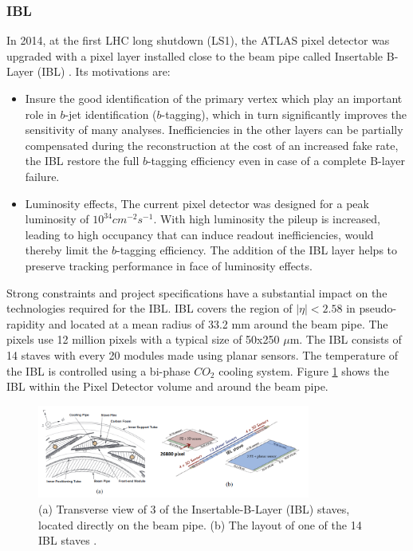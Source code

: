 \subsubsection{IBL}
\label{chap2:ATLAS:ITK:IBL}
In 2014, at the first LHC long shutdown (LS1), the ATLAS pixel detector was upgraded with a pixel layer installed close to the beam pipe called Insertable B-Layer (IBL) \cite{IBL_TDR}. Its motivations are:
\begin{itemize}
	\item Insure the good identification of the primary vertex which play an important role in $b$-jet identification ($b$-tagging), which in turn significantly improves the sensitivity of many analyses. Inefficiencies in the other layers can be partially compensated during the reconstruction at the cost of an increased fake rate, the IBL restore the full $b$-tagging efficiency even in case of a complete B-layer failure.
	\item Luminosity effects, The current pixel detector was designed for a peak luminosity of $10^{34} cm^{-2}s^{-1}$. With high luminosity the pileup is increased, leading to high occupancy that can induce readout inefficiencies, would thereby limit the $b$-tagging efficiency. The addition of the IBL layer helps to preserve tracking performance in face of luminosity effects.
\end{itemize}
Strong constraints and project specifications have a substantial impact on the technologies required for the IBL. IBL covers the region of $|\eta|< 2.58$ in pseudo-rapidity and located at a mean radius of 33.2 mm around the beam pipe. The pixels use 12 million pixels with a typical size of 50x250 $\mu$m. The IBL consists of 14 staves with every 20 modules made using planar sensors. The temperature of the IBL is controlled using a bi-phase $CO_2$ cooling system. Figure \ref{fig:chap2:ATLAS:ITK:IBL} shows the IBL within the Pixel Detector volume and around the beam pipe.
\begin{figure}[htbp]
    \centering
    \includegraphics[width=0.8\textwidth]{Ch2/Img/IBL.png}
    \caption{(a) Transverse view of 3 of the Insertable-B-Layer (IBL) staves, located directly on the beam pipe. (b) The layout of one of the 14 IBL staves \cite{ID_withIBL}.}
    \label{fig:chap2:ATLAS:ITK:IBL}
\end{figure}

